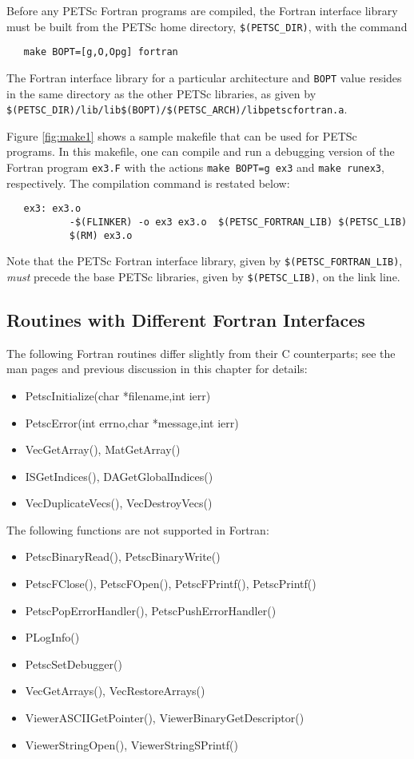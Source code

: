 Before any PETSc Fortran programs are compiled, the Fortran interface
library must be built from the PETSc home directory, {\tt \$(PETSC\_DIR)},
with the command
\begin{verbatim}
   make BOPT=[g,O,Opg] fortran
\end{verbatim}
The Fortran interface library  for a particular architecture and {\tt BOPT} value
resides in the same directory as the other PETSc libraries, as given by
{\tt \$(PETSC\_DIR)/lib/lib\$(BOPT)/\$(PETSC\_ARCH)/libpetscfortran.a}.

Figure \ref{fig:make1} shows a sample makefile that can be used for
PETSc programs.  In this makefile, one can compile and run a debugging version
of the Fortran program {\tt ex3.F} with the actions {\tt make BOPT=g ex3} and
{\tt make runex3}, respectively. The compilation command is restated below:
\begin{verbatim}
   ex3: ex3.o 
           -$(FLINKER) -o ex3 ex3.o  $(PETSC_FORTRAN_LIB) $(PETSC_LIB)
           $(RM) ex3.o
\end{verbatim}
Note that the PETSc Fortran interface library, given by 
{\tt \$(PETSC\_FORTRAN\_LIB)}, {\em must}   precede
the base PETSc libraries, given by {\tt \$(PETSC\_LIB)}, 
on the link line.

\subsection{Routines with Different Fortran Interfaces}
\label{sec:fortran_exceptions}

The following Fortran routines differ slightly from their C counterparts; see the 
man pages and previous discussion in this chapter for details:
\begin{itemize}
\item PetscInitialize(char *filename,int ierr)
\item PetscError(int errno,char *message,int ierr)
\item VecGetArray(), MatGetArray()
\item ISGetIndices(), DAGetGlobalIndices()
\item VecDuplicateVecs(), VecDestroyVecs()
\end{itemize}
The following functions are not supported in Fortran:
\begin{itemize}
\item PetscBinaryRead(), PetscBinaryWrite()
\item PetscFClose(), PetscFOpen(), PetscFPrintf(), PetscPrintf()
\item PetscPopErrorHandler(), PetscPushErrorHandler()
\item PLogInfo()
\item PetscSetDebugger()
\item VecGetArrays(), VecRestoreArrays()
\item ViewerASCIIGetPointer(), ViewerBinaryGetDescriptor()
\item ViewerStringOpen(), ViewerStringSPrintf()
\end{itemize}

